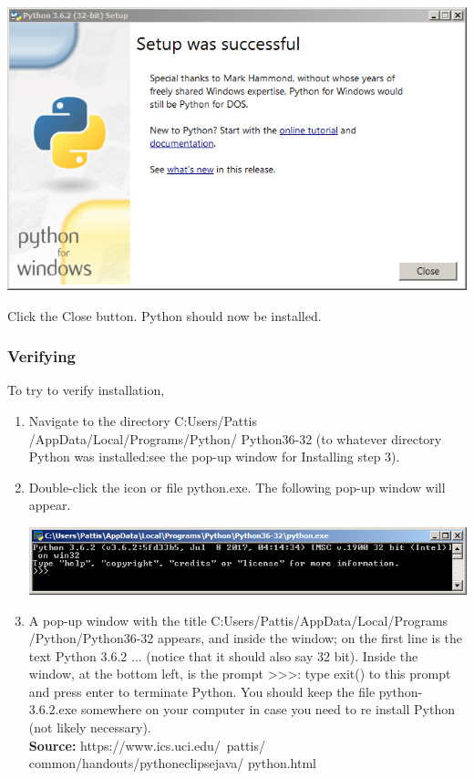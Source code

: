\documentclass[11pt]{article}
\begin{document}
\begin{multicols}{2}
\begin{enumerate}
\begin{center}
\includegraphics[scale=0.43]{7.jpg} \\ 
\end{center}
Click the Close button.
Python should now be installed.
\end{enumerate}
\subsubsection{Verifying}
To try to verify installation,
\begin{enumerate}
\item Navigate to the directory C:Users/Pattis /AppData/Local/Programs/Python/ Python36-32 (to whatever directory Python was installed:see the pop-up window for Installing step $3$). 
\item Double-click the icon or file python.exe. The following pop-up window will appear.
\begin{center}
\includegraphics[scale=0.45]{8.jpg} \\ 
\end{center}

\item A pop-up window with the title C:Users/Pattis/AppData/Local/Programs /Python/Python36-32 appears, and inside the window; on the first line is the text Python 3.6.2 ... (notice that it should also say 32 bit). Inside the window, at the bottom left, is the prompt >>>: type exit() to this prompt and press enter to terminate Python.
You should keep the file python-3.6.2.exe somewhere on your computer in case you need to re install Python (not likely necessary).
\\\textbf{Source:} https://www.ics.uci.edu/~pattis/ common/handouts/pythoneclipsejava/ python.html
\end{enumerate}

\end{multicols}
\end{document}

